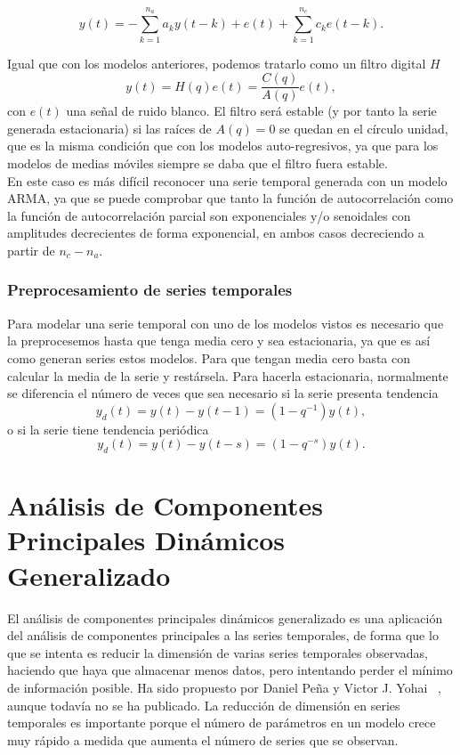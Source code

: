 \begin{equation}
y(t) = - \sum_{k=1}^{n_a} a_k y(t-k) + e(t) + \sum_{k=1}^{n_c} c_k e(t-k).
\end{equation}

Igual que con los modelos anteriores, podemos tratarlo como un filtro digital $H$
\[	y(t) = H(q)e(t) = \frac{C(q)}{A(q)}e(t),	\]
con $e(t)$ una señal de ruido blanco. El filtro será estable (y por tanto la serie generada estacionaria) si las raíces de $A(q) = 0$ se quedan en el círculo unidad, que es la misma condición que con los modelos auto-regresivos, ya que para los modelos de medias móviles siempre se daba que el filtro fuera estable.\\

En este caso es más difícil reconocer una serie temporal generada con un modelo ARMA, ya que se puede comprobar que tanto la función de autocorrelación como la función de autocorrelación parcial son exponenciales y/o senoidales con amplitudes decrecientes de forma exponencial, en ambos casos decreciendo a partir de $n_c-n_a$.

\subsubsection{Preprocesamiento de series temporales}

Para modelar una serie temporal con uno de los modelos vistos es necesario que la preprocesemos hasta que tenga media cero y sea estacionaria, ya que es así como generan series estos modelos. Para que tengan media cero basta con calcular la media de la serie y restársela. Para hacerla estacionaria, normalmente se diferencia el número de veces que sea necesario si la serie presenta tendencia
\[	y_d(t) = y(t) - y(t-1) = (1 - q^{-1})y(t),	\]
o si la serie tiene tendencia periódica
\[	y_d(t) = y(t) - y(t-s) = (1 - q^{-s})y(t).	\]


\section{Análisis de Componentes Principales Dinámicos Generalizado}

El análisis de componentes principales dinámicos generalizado es una aplicación del análisis de componentes principales a las series temporales, de forma que lo que se intenta es reducir la dimensión de varias series temporales observadas, haciendo que haya que almacenar menos datos, pero intentando perder el mínimo de información posible. Ha sido propuesto por Daniel Peña y Victor J. Yohai ~\cite{pena16}, aunque todavía no se ha publicado. La reducción de dimensión en series temporales es importante porque el número de parámetros en un modelo crece muy rápido a medida que aumenta el número de series que se observan.

